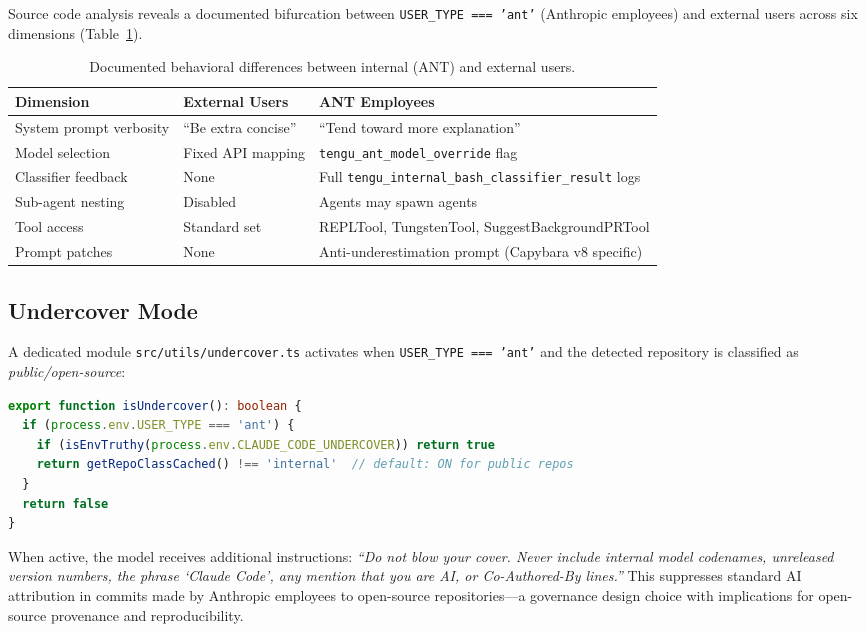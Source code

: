 \documentclass{article}
\newcommand{\file}[1]{\texttt{\small #1}}
\newcommand{\code}[1]{\texttt{#1}}
\begin{document}
Source code analysis reveals a documented bifurcation between \code{USER\_TYPE === 'ant'} (Anthropic employees) and external users across six dimensions (Table~\ref{tab:dual}).

\begin{table}[t]
\centering
\caption{Documented behavioral differences between internal (ANT) and external users.}
\label{tab:dual}
\small
\begin{tabular}{lll}
\toprule
\textbf{Dimension} & \textbf{External Users} & \textbf{ANT Employees} \\
\midrule
System prompt verbosity & ``Be extra concise'' & ``Tend toward more explanation'' \\
Model selection & Fixed API mapping & \code{tengu\_ant\_model\_override} flag \\
Classifier feedback & None & Full \code{tengu\_internal\_bash\_classifier\_result} logs \\
Sub-agent nesting & Disabled & Agents may spawn agents \\
Tool access & Standard set & REPLTool, TungstenTool, SuggestBackgroundPRTool \\
Prompt patches & None & Anti-underestimation prompt (Capybara v8 specific) \\
\bottomrule
\end{tabular}
\end{table}

\subsection{Undercover Mode}

A dedicated module \file{src/utils/undercover.ts} activates when \code{USER\_TYPE === 'ant'} and the detected repository is classified as \emph{public/open-source}:

\begin{lstlisting}[language=TypeScript, caption={Undercover mode activation logic.}]
export function isUndercover(): boolean {
  if (process.env.USER_TYPE === 'ant') {
    if (isEnvTruthy(process.env.CLAUDE_CODE_UNDERCOVER)) return true
    return getRepoClassCached() !== 'internal'  // default: ON for public repos
  }
  return false
}
\end{lstlisting}

When active, the model receives additional instructions: \emph{``Do not blow your cover. Never include internal model codenames, unreleased version numbers, the phrase `Claude Code', any mention that you are AI, or Co-Authored-By lines.''} This suppresses standard AI attribution in commits made by Anthropic employees to open-source repositories---a governance design choice with implications for open-source provenance and reproducibility.
\end{document}
